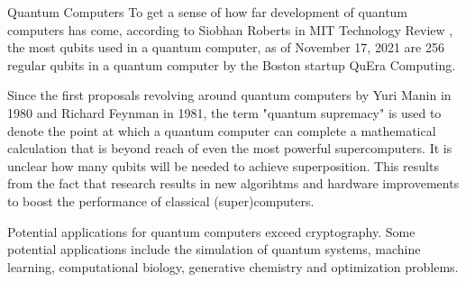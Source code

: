 \documentclass[aps,preprintnumbers,twocolumn]{revtex4}
\begin{document}
\begin{section}{Quantum Computers}
To get a sense of how far development of quantum computers has come, 
according to Siobhan Roberts in MIT Technology Review \cite{MIT}, 
the most qubits used in a quantum computer, 
as of November 17, 2021 are 256 regular qubits in a quantum computer by the Boston startup QuEra Computing. 

Since the first proposals revolving around quantum computers by Yuri Manin in 1980 and Richard Feynman in 1981,
the term "quantum supremacy" is used to denote the point at which a quantum computer can complete a mathematical calculation that is beyond reach of even the most powerful supercomputers.
It is unclear how many qubits will be needed to achieve superposition. 
This results from the fact that research results in new algorihtms and hardware improvements to boost the performance of classical (super)computers. 

Potential applications for quantum computers exceed cryptography. Some potential applications include the simulation of quantum systems, machine learning, computational biology, generative chemistry and optimization problems. 
\end{section}
\end{document}
